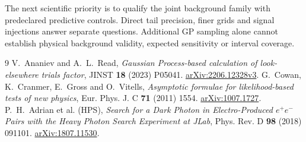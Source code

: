 \documentclass[11pt]{article}
\begin{document}
The next scientific priority is to qualify the joint background family with predeclared predictive controls. Direct tail precision, finer grids and signal injections answer separate questions. Additional GP sampling alone cannot establish physical background validity, expected sensitivity or interval coverage.

\clearpage

\clearpage
\begin{thebibliography}{9}
 V.~Ananiev and A.~L.~Read, \emph{Gaussian Process-based calculation of look-elsewhere trials factor}, JINST \textbf{18} (2023) P05041. \href{https://arxiv.org/abs/2206.12328v3}{arXiv:2206.12328v3}.
 G.~Cowan, K.~Cranmer, E.~Gross and O.~Vitells, \emph{Asymptotic formulae for likelihood-based tests of new physics}, Eur. Phys. J. C \textbf{71} (2011) 1554. \href{https://arxiv.org/abs/1007.1727}{arXiv:1007.1727}.
 P.~H.~Adrian et al. (HPS), \emph{Search for a Dark Photon in Electro-Produced $e^+e^-$ Pairs with the Heavy Photon Search Experiment at JLab}, Phys. Rev. D \textbf{98} (2018) 091101. \href{https://arxiv.org/abs/1807.11530}{arXiv:1807.11530}.
\end{thebibliography}
\end{document}
